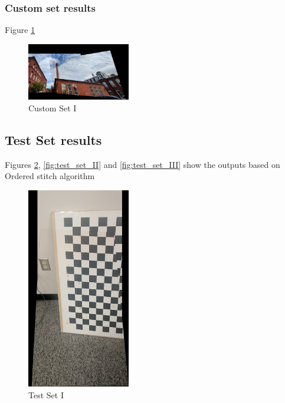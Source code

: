 \documentclass[conference]{IEEEtran}
\begin{document}
\subsubsection{Custom set results}
Figure \ref{fig:custom_set_I}
\begin{figure}[!htbp]
  \centering
  \includegraphics[width=0.4\textwidth]{phase1/customset1_image123_clear_stitch3.png}
  \caption{Custom Set I}
  \label{fig:custom_set_I}
\end{figure}

\subsection{Test Set results}
Figures \ref{fig:test_set_I}, \ref{fig:test_set_II} and \ref{fig:test_set_III} show the outputs based on Ordered stitch algorithm 

\begin{figure}[!htbp]
  \centering
  \includegraphics[width=0.4\textwidth]{phase1/testset1_image12_clear_stitch2.png}
  \caption{Test Set I}
  \label{fig:test_set_I}
\end{figure}
\end{document}
